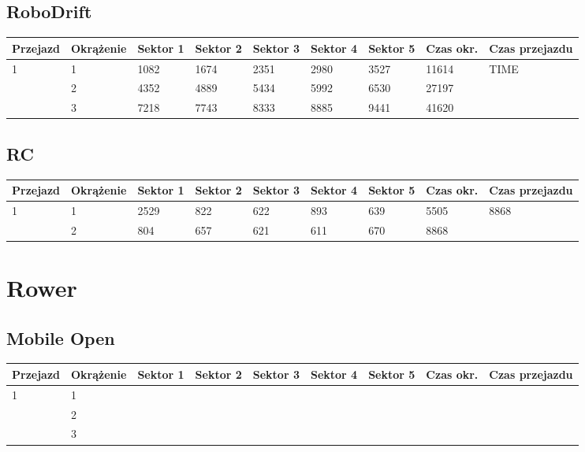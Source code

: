 \documentclass[11pt]{article}
\begin{document}
\subsection{RoboDrift}
\begin{table}[h]
\begin{tabular}{|l|l|l|l|l|l|l|l|l|}
\hline
   Przejazd        & Okrążenie & Sektor 1 & Sektor 2 & Sektor 3 & Sektor 4 & Sektor 5 & Czas okr. & Czas przejazdu    \\ \hline
\multirow{3}{*}{1}& 1 &1082& 1674& 2351& 2980& 3527& 11614& \multirow{3}{*}{TIME} \\ \cline{2-8}
& 2& 4352& 4889& 5434& 5992& 6530& 27197& \\ \cline{2-8}
& 3& 7218& 7743& 8333& 8885& 9441& 41620& \\ \hline
\end{tabular}
\end{table}
\subsection{RC}
\begin{table}[h]
\begin{tabular}{|l|l|l|l|l|l|l|l|l|}
\hline
 Przejazd        & Okrążenie & Sektor 1 & Sektor 2 & Sektor 3 & Sektor 4 & Sektor 5 & Czas okr. & Czas przejazdu    \\ \hline
\multirow{2}{*}{1}& 1 &2529& 822& 622& 893& 639& 5505& \multirow{2}{*}{8868} \\ \cline{2-8}
& 2& 804& 657& 621& 611& 670& 8868& \\ \hline
\end{tabular}
\end{table}
\pagebreak
\section{Rower}
\subsection{Mobile Open}
\begin{table}[h]
\begin{tabular}{|l|l|l|l|l|l|l|l|l|}
\hline
   Przejazd        & Okrążenie & Sektor 1 & Sektor 2 & Sektor 3 & Sektor 4 & Sektor 5 & Czas okr. & Czas przejazdu    \\ \hline
\multirow{3}{*}{1} & 1         &          &          &          &          &          &           & \multirow{3}{*}{} \\ \cline{2-8}
                         & 2         &          &          &          &          &          &           &                    \\ \cline{2-8}
                         & 3         &          &          &          &          &          &           &                    \\ \hline
\end{tabular}
\end{table}
\end{document}
